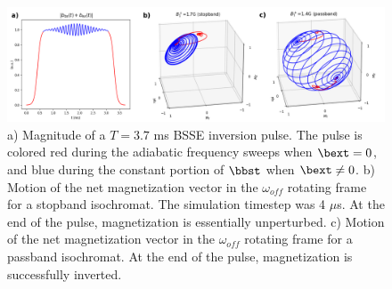 \begin{figure}[h]
\centering
\includegraphics[width=1.1\textwidth]{figures/trajectory_figure.png}
\caption{a) Magnitude of a $T = 3.7$ ms BSSE inversion pulse. 
The pulse is colored red during the adiabatic frequency sweeps when $\bext = 0$, and blue during the constant portion of $\bbst$ when $\bext \neq 0$. 
b) Motion of the net magnetization vector in the $\omega_{off}$ rotating frame for a stopband isochromat. 
The simulation timestep was 4 $\mu$s. At the end of the pulse, magnetization is essentially unperturbed.
c) Motion of the net magnetization vector in the $\omega_{off}$ rotating frame for a passband isochromat. 
At the end of the pulse, magnetization is successfully inverted.}
\label{fig:motion}
\end{figure}


